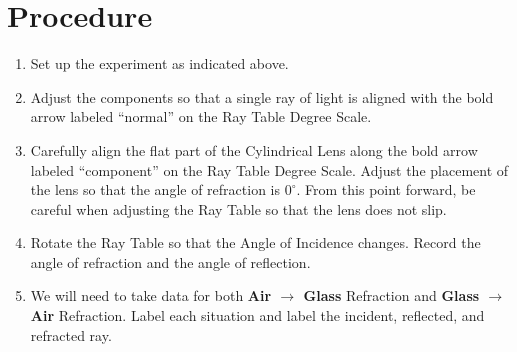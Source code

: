 \documentclass[10pt]{exam}
\begin{document}
\vspace{-1em}

\section*{Procedure}
\begin{enumerate}
  \item Set up the experiment as indicated above.
  \item Adjust the components so that a single ray of light is aligned with the bold arrow labeled ``normal'' on the Ray Table Degree Scale.
  \item Carefully align the flat part of the Cylindrical Lens along the bold arrow labeled ``component'' on the Ray Table Degree Scale.  Adjust the placement of the lens so that the angle of refraction is $0^\circ$.  From this point forward, be careful when adjusting the Ray Table so that the lens does not slip.
  \item Rotate the Ray Table so that the Angle of Incidence changes.  Record the angle of refraction and the angle of reflection.
  \item We will need to take data for both {\bf Air $\rightarrow$ Glass} Refraction and {\bf Glass $\rightarrow$ Air} Refraction.  Label each situation and label the incident, reflected, and refracted ray. 
  
  \begin{center}
\end{center}
\end{enumerate}
\end{document}

